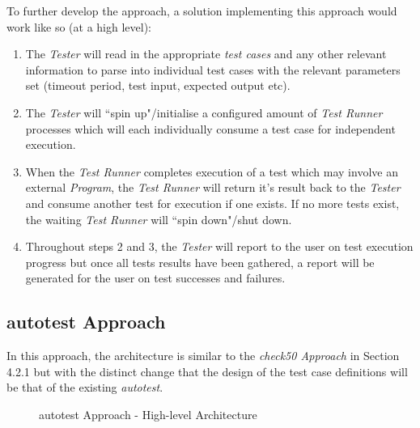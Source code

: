 \documentclass[hidelinks]{report}
\begin{document}
To further develop the approach, a solution implementing this approach would work like so (at a high level):
\begin{enumerate}
	\item The \textit{Tester} will read in the appropriate \textit{test cases} and any other relevant information to parse into individual test cases with the relevant parameters set (timeout period, test input, expected output etc).
	\item The \textit{Tester} will ``spin up"/initialise a configured amount of \textit{Test Runner} processes which will each individually consume a test case for independent execution.
	\item When the \textit{Test Runner} completes execution of a test which may involve an external \textit{Program}, the \textit{Test Runner} will return it's result back to the \textit{Tester} and consume another test for execution if one exists. If no more tests exist, the waiting \textit{Test Runner} will ``spin down"/shut down.
	\item Throughout steps 2 and 3, the \textit{Tester} will report to the user on test execution progress but once all tests results have been gathered, a report will be generated for the user on test successes and failures.
\end{enumerate}

\subsection{autotest Approach}

In this approach, the architecture is similar to the \textit{check50 Approach} in Section 4.2.1 but with the distinct change that the design of the test case definitions will be that of the existing \textit{autotest}.

\begin{figure}[h]
	\centering
	\caption{autotest Approach - High-level Architecture}
	\label{fig:approach2-1}
\end{figure}
\end{document}
